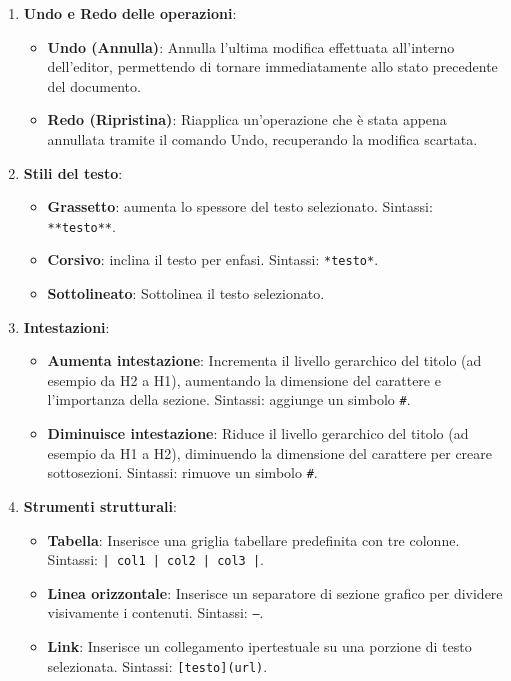 \documentclass[11pt,a4paper]{article}
\begin{document}
\begin{enumerate}
    \item \textbf{Undo e Redo delle operazioni}:
    \begin{itemize}
        \item \textbf{Undo (Annulla)}: Annulla l'ultima modifica effettuata all'interno dell'editor, permettendo di tornare immediatamente allo stato precedente del documento.
        \item \textbf{Redo (Ripristina)}: Riapplica un'operazione che è stata appena annullata tramite il comando Undo, recuperando la modifica scartata.
    \end{itemize}
    \item \textbf{Stili del testo}:
    \begin{itemize}
        \item \textbf{Grassetto}: aumenta lo spessore del testo selezionato. Sintassi: \texttt{**testo**}.
        \item \textbf{Corsivo}: inclina il testo per enfasi. Sintassi: \texttt{*testo*}.
        \item \textbf{Sottolineato}: Sottolinea il testo selezionato.
    \end{itemize}
    \item \textbf{Intestazioni}:
    \begin{itemize}
        \item \textbf{Aumenta intestazione}: Incrementa il livello gerarchico del titolo (ad esempio da H2 a H1), aumentando la dimensione del carattere e l'importanza della sezione. Sintassi: aggiunge un simbolo \texttt{\#}.
        \item \textbf{Diminuisce intestazione}: Riduce il livello gerarchico del titolo (ad esempio da H1 a H2), diminuendo la dimensione del carattere per creare sottosezioni. Sintassi: rimuove un simbolo \texttt{\#}.
    \end{itemize}
    
    \item \textbf{Strumenti strutturali}:
    \begin{itemize}
        \item \textbf{Tabella}: Inserisce una griglia tabellare predefinita con tre colonne. Sintassi: \texttt{| col1 | col2 | col3 |}.
        \item \textbf{Linea orizzontale}: Inserisce un separatore di sezione grafico per dividere visivamente i contenuti. Sintassi: \texttt{---}.
        \item \textbf{Link}: Inserisce un collegamento ipertestuale su una porzione di testo selezionata. Sintassi: \texttt{[testo](url)}.
    \end{itemize}
    

\end{enumerate}
\end{document}
